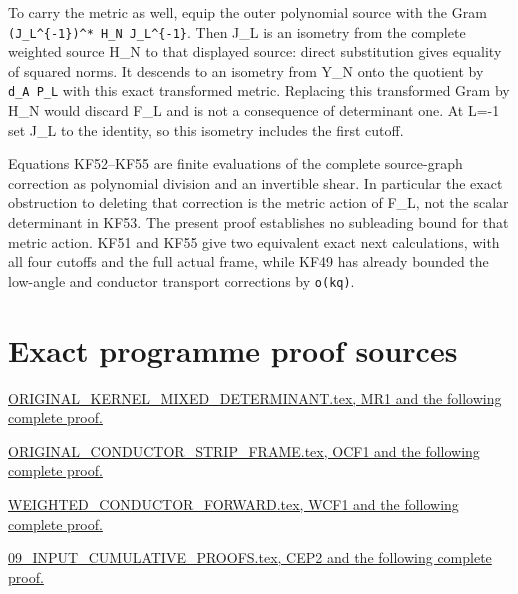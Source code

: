 \documentclass[11pt]{article}
\begin{document}
To carry the metric as well, equip the outer polynomial source with the Gram \nolinkurl{(J_L^{-1})^* H_N J_L^{-1}}. Then J\_L is an isometry from the complete weighted source H\_N to that displayed source: direct substitution gives equality of squared norms. It descends to an isometry from Y\_N onto the quotient by \texttt{d\_A\ P\_L} with this exact transformed metric. Replacing this transformed Gram by H\_N would discard F\_L and is not a consequence of determinant one. At L=-1 set J\_L to the identity, so this isometry includes the first cutoff.

Equations KF52--KF55 are finite evaluations of the complete source-graph correction as polynomial division and an invertible shear. In particular the exact obstruction to deleting that correction is the metric action of F\_L, not the scalar determinant in KF53. The present proof establishes no subleading bound for that metric action. KF51 and KF55 give two equivalent exact next calculations, with all four cutoffs and the full actual frame, while KF49 has already bounded the low-angle and conductor transport corrections by \texttt{o(kq)}.

\section*{Exact programme proof sources}
\par\href{https://github.com/KokunoYumeto/zeta-function-research-reader/blob/5992ad50c0f2a06921f1fcaded7b4e38097c0739/workbenches/splitzero-tandem/continuations/20260920-original-kernel-mixed-determinants/ORIGINAL_KERNEL_MIXED_DETERMINANT.tex#L36}{ORIGINAL\_KERNEL\_MIXED\_DETERMINANT.tex, MR1 and the following complete proof.}
\par\href{https://github.com/KokunoYumeto/zeta-function-research-reader/blob/5992ad50c0f2a06921f1fcaded7b4e38097c0739/workbenches/splitzero-tandem/continuations/20260920-original-kernel-mixed-determinants/providers/ORIGINAL_CONDUCTOR_STRIP_FRAME.tex#L27}{ORIGINAL\_CONDUCTOR\_STRIP\_FRAME.tex, OCF1 and the following complete proof.}
\par\href{https://github.com/KokunoYumeto/zeta-function-research-reader/blob/5992ad50c0f2a06921f1fcaded7b4e38097c0739/workbenches/splitzero-tandem/continuations/20260920-original-kernel-mixed-determinants/providers/WEIGHTED_CONDUCTOR_FORWARD.tex#L28}{WEIGHTED\_CONDUCTOR\_FORWARD.tex, WCF1 and the following complete proof.}
\par\href{https://github.com/KokunoYumeto/zeta-function-research-reader/blob/5992ad50c0f2a06921f1fcaded7b4e38097c0739/workbenches/splitzero-tandem/continuations/20260920-original-kernel-mixed-determinants/providers/09_INPUT_CUMULATIVE_PROOFS.tex#L19060}{09\_INPUT\_CUMULATIVE\_PROOFS.tex, CEP2 and the following complete proof.}
\end{document}
